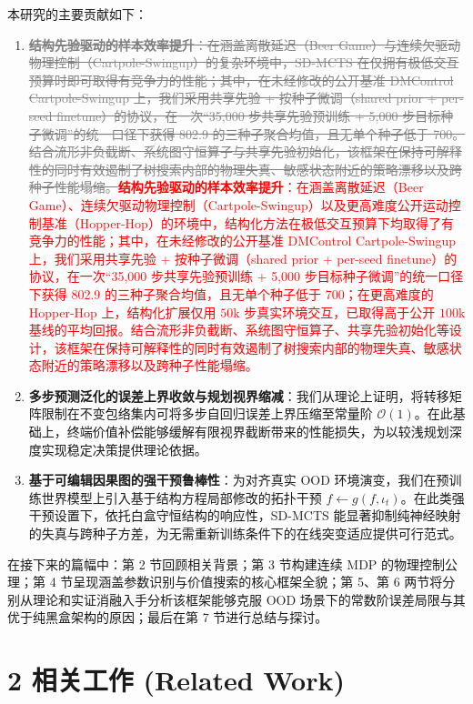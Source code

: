 \documentclass[UTF8]{ctexart}
\newcommand{\revadd}[1]{\textcolor{red}{#1}}
\newcommand{\revdel}[1]{\textcolor{gray}{\sout{#1}}}
\begin{document}
本研究的主要贡献如下：

\begin{enumerate}
\item \revdel{\textbf{结构先验驱动的样本效率提升}：在涵盖离散延迟（Beer Game）与连续欠驱动物理控制（Cartpole-Swingup）的复杂环境中，SD-MCTS 在仅拥有极低交互预算时即可取得有竞争力的性能；其中，在未经修改的公开基准 DMControl Cartpole-Swingup 上，我们采用共享先验 + 按种子微调（shared prior + per-seed finetune）的协议，在一次“35,000 步共享先验预训练 + 5,000 步目标种子微调”的统一口径下获得 802.9 的三种子聚合均值，且无单个种子低于 700。结合流形非负截断、系统图守恒算子与共享先验初始化，该框架在保持可解释性的同时有效遏制了树搜索内部的物理失真、敏感状态附近的策略漂移以及跨种子性能塌缩。}\revadd{\textbf{结构先验驱动的样本效率提升}：在涵盖离散延迟（Beer Game）、连续欠驱动物理控制（Cartpole-Swingup）以及更高难度公开运动控制基准（Hopper-Hop）的环境中，结构化方法在极低交互预算下均取得了有竞争力的性能；其中，在未经修改的公开基准 DMControl Cartpole-Swingup 上，我们采用共享先验 + 按种子微调（shared prior + per-seed finetune）的协议，在一次“35,000 步共享先验预训练 + 5,000 步目标种子微调”的统一口径下获得 802.9 的三种子聚合均值，且无单个种子低于 700；在更高难度的 Hopper-Hop 上，结构化扩展仅用 \(50\text{k}\) 步真实环境交互，已取得高于公开 \(100\text{k}\) 基线的平均回报。结合流形非负截断、系统图守恒算子、共享先验初始化等设计，该框架在保持可解释性的同时有效遏制了树搜索内部的物理失真、敏感状态附近的策略漂移以及跨种子性能塌缩。}
\item \textbf{多步预测泛化的误差上界收敛与规划视界缩减}：我们从理论上证明，将转移矩阵限制在不变包络集内可将多步自回归误差上界压缩至常量阶 \(\mathcal{O}(1)\)。在此基础上，终端价值补偿能够缓解有限视界截断带来的性能损失，为以较浅规划深度实现稳定决策提供理论依据。
\item \textbf{基于可编辑因果图的强干预鲁棒性}：为对齐真实 OOD 环境演变，我们在预训练世界模型上引入基于结构方程局部修改的拓扑干预 \(f \leftarrow g(f, \iota_t)\)。在此类强干预设置下，依托白盒守恒结构的响应性，SD-MCTS 能显著抑制纯神经映射的失真与跨种子方差，为无需重新训练条件下的在线突变适应提供可行范式。
\end{enumerate}

在接下来的篇幅中：第 2 节回顾相关背景；第 3 节构建连续 MDP
的物理控制公理；第 4 节呈现涵盖参数识别与价值搜索的核心框架全貌；第
5、第 6 两节将分别从理论和实证消融入手分析该框架能够克服 OOD 场景下的常数阶误差局限与其优于纯黑盒架构的原因；最后在第 7 节进行总结与探讨。

\hypertarget{sec-related-work}{%
\section{2 相关工作 (Related
Work)}\label{sec-related-work}}
\end{document}
